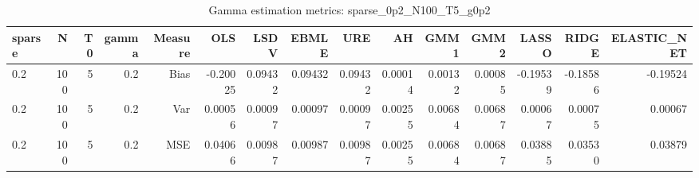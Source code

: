 \begin{table}[!htbp]\centering
\caption{Gamma estimation metrics: sparse_0p2_N100_T5_g0p2}
\label{tab:table1_sparse_0p2_N100_T5_g0p2}
\begin{tabular}{lrrrrrrrrrrrrrr}
\hline
sparse & N & T0 & gamma & Measure & OLS & LSDV & EBMLE & URE & AH & GMM1 & GMM2 & LASSO & RIDGE & ELASTIC_NET \\
\hline
0.2 & 100 & 5 & 0.2 & Bias & -0.20025 & 0.09432 & 0.09432 & 0.09432 & 0.00014 & 0.00132 & 0.00085 & -0.19539 & -0.18586 & -0.19524 \\
0.2 & 100 & 5 & 0.2 & Var & 0.00056 & 0.00097 & 0.00097 & 0.00097 & 0.00255 & 0.00684 & 0.00687 & 0.00067 & 0.00075 & 0.00067 \\
0.2 & 100 & 5 & 0.2 & MSE & 0.04066 & 0.00987 & 0.00987 & 0.00987 & 0.00255 & 0.00684 & 0.00687 & 0.03885 & 0.03530 & 0.03879 \\
\hline
\end{tabular}
\end{table}


